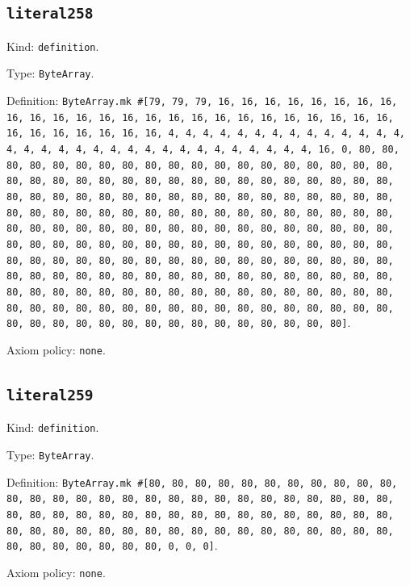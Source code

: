 \documentclass[11pt]{article}
\begin{document}
\subsection*{\texttt{literal258}}
\noindent Kind: \texttt{definition}.\par
\noindent Type: \texttt{ByteArray}.\par
\noindent Definition: \texttt{ByteArray.mk \#[79, 79, 79, 16, 16, 16, 16, 16, 16, 16, 16, 16, 16, 16, 16, 16, 16, 16, 16, 16, 16, 16, 16, 16, 16, 16, 16, 16, 16, 16, 16, 16, 16, 16, 16, 4, 4, 4, 4, 4, 4, 4, 4, 4, 4, 4, 4, 4, 4, 4, 4, 4, 4, 4, 4, 4, 4, 4, 4, 4, 4, 4, 4, 4, 4, 4, 4, 16, 0, 80, 80, 80, 80, 80, 80, 80, 80, 80, 80, 80, 80, 80, 80, 80, 80, 80, 80, 80, 80, 80, 80, 80, 80, 80, 80, 80, 80, 80, 80, 80, 80, 80, 80, 80, 80, 80, 80, 80, 80, 80, 80, 80, 80, 80, 80, 80, 80, 80, 80, 80, 80, 80, 80, 80, 80, 80, 80, 80, 80, 80, 80, 80, 80, 80, 80, 80, 80, 80, 80, 80, 80, 80, 80, 80, 80, 80, 80, 80, 80, 80, 80, 80, 80, 80, 80, 80, 80, 80, 80, 80, 80, 80, 80, 80, 80, 80, 80, 80, 80, 80, 80, 80, 80, 80, 80, 80, 80, 80, 80, 80, 80, 80, 80, 80, 80, 80, 80, 80, 80, 80, 80, 80, 80, 80, 80, 80, 80, 80, 80, 80, 80, 80, 80, 80, 80, 80, 80, 80, 80, 80, 80, 80, 80, 80, 80, 80, 80, 80, 80, 80, 80, 80, 80, 80, 80, 80, 80, 80, 80, 80, 80, 80, 80, 80, 80, 80, 80, 80, 80, 80, 80, 80, 80, 80, 80, 80, 80, 80, 80, 80, 80, 80, 80, 80, 80, 80]}.\par
\noindent Axiom policy: \texttt{none}.\par
\subsection*{\texttt{literal259}}
\noindent Kind: \texttt{definition}.\par
\noindent Type: \texttt{ByteArray}.\par
\noindent Definition: \texttt{ByteArray.mk \#[80, 80, 80, 80, 80, 80, 80, 80, 80, 80, 80, 80, 80, 80, 80, 80, 80, 80, 80, 80, 80, 80, 80, 80, 80, 80, 80, 80, 80, 80, 80, 80, 80, 80, 80, 80, 80, 80, 80, 80, 80, 80, 80, 80, 80, 80, 80, 80, 80, 80, 80, 80, 80, 80, 80, 80, 80, 80, 80, 80, 80, 80, 80, 80, 80, 80, 80, 80, 80, 0, 0, 0]}.\par
\noindent Axiom policy: \texttt{none}.\par
\end{document}
